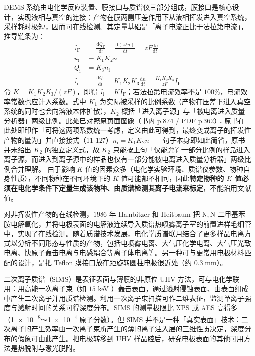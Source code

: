 \begin{principle}
 DEMS 系统由电化学反应装置、膜接口与质谱仪三部分组成，膜接口是核心设计，实现液相与真空的连接：产物在膜两侧压差作用下从液相挥发进入真空系统，采样耗时极短，因而可在线检测。其定量基础是「离子电流正比于法拉第电流」，推导链条为：
 \begin{align}
  I_{\mathrm{F}}&=\frac{\mathrm{d}Q_{\mathrm{F}}}{\mathrm{d}t}=\frac{\mathrm{d}(zFn)}{\mathrm{d}t}=zF\frac{\mathrm{d}n}{\mathrm{d}t}
  \label{eq:dems-if}\\
  n_{\mathrm{i}}&=K_{1}K_{2}n
  \label{eq:dems-ni}\\
  Q_{\mathrm{i}}&=K_{3}n_{\mathrm{i}}
  \label{eq:dems-qi}\\
  I_{\mathrm{i}}&=\frac{\mathrm{d}Q_{\mathrm{i}}}{\mathrm{d}t}
   =K_{1}K_{2}K_{3}\frac{\mathrm{d}n}{\mathrm{d}t}
   =\frac{K_{1}K_{2}K_{3}}{zF}I_{\mathrm{F}}
  \label{eq:dems-ii}
 \end{align}
 令 $K=K_{1}K_{2}K_{3}/(zF)$，即得 $I_{\mathrm{i}}=KI_{\mathrm{F}}$；若法拉第电流效率不是 $100\%$，电流效率常数也应计入系数。式中 $K_{1}$ 为实际被采样的比例系数（产物在压差下进入真空系统的同时也会向溶液本体扩散），$K_{2}$ 概括「进入离子源」与「被电离进入质量分析器」两级比例。此处已对照原页面图像（书内 p.874 / PDF p.362）：原书在此处即印作「可将这两项系数统一考虑，定义由此可得到，最终变成离子的挥发性产物的量为」并直接接式（11-127）$n_{\mathrm{i}}=K_{1}K_{2}n$——句子本身即如此简省，原书并未给出 $K_{2}$ 的独立定义式，故 $K_{2}$ 只能按上句「仅能允许一部分比例的样品进入离子源，而进入到离子源中的样品也仅有一部分能被电离进入质量分析器」两级比例合并理解。
 由于影响 $K$ 值的因素众多（电化学实验环境、质谱仪参数、物种自身性质），不同物种在不同环境下的 $K$ 值可能都不相同，因此\textbf{特定物种的 $K$ 值必须在电化学条件下定量生成该物种、由质谱检测其离子电流来标定}，不能沿用文献值。
\end{principle}

对非挥发性产物的在线检测，$1986$ 年 Hambitzer 和 Heitbaum 把 N,\,N-二甲基苯胺电解氧化，并将电极表面的电解液连续导入质谱热喷雾离子室的前置进样毛细管中，实现了在线检测。随着质谱技术发展，电化学质谱联用结合了更多样品电离方式以分析不同形态与性质的产物，包括电喷雾电离、大气压化学电离、大气压光致电离、快原子轰击电离与电感耦合等离子体电离等。另一种可与更常用电极材料匹配的设计，是把 Teflon 膜接口放在距旋转圆柱电极很近处（约 $0.3$ mm）。

二次离子质谱（SIMS）是表征表面与薄膜的非原位 UHV 方法，可与电化学联用：用高能一次离子束（如 $15$ keV ）轰击表面，通过溅射侵蚀表面、由表面组成中产生二次离子并用质谱检测。利用一次离子束扫描可作二维表征，监测单离子强度与溅射时间的关系可得深度分布。SIMS 的测量极限比 XPS 或 AES 高得多（\num{1e-8}～\num{1e-4} 原子分数）。但 SIMS 并不是一种「真实表面」技术：二次离子的产生效率由一次离子束所产生的薄的离子注入层的三维性质决定，深度分布的假象可由此产生。把电极转移到 UHV 样品腔后，研究电极表面的其他可用方法是热脱附与激光脱附。

